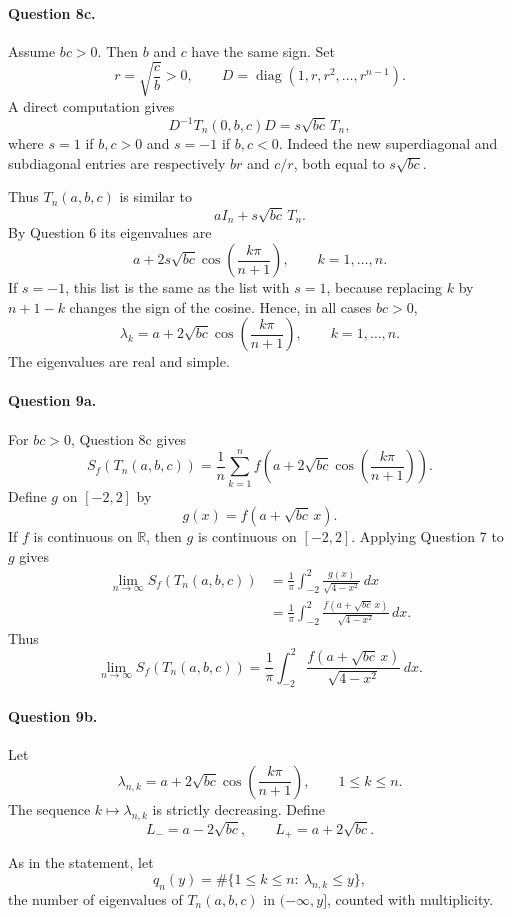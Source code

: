 \documentclass[11pt,a4paper]{article}
\newcommand{\R}{\mathbb{R}}
\DeclareMathOperator{\diag}{diag}
\begin{document}
\paragraph{Question 8c.}
Assume $bc>0$.  Then $b$ and $c$ have the same sign.  Set
\[
  r=\sqrt{\frac cb}>0,
  \qquad
  D=\diag(1,r,r^2,\dots,r^{n-1}).
\]
A direct computation gives
\[
  D^{-1}T_n(0,b,c)D=s\sqrt{bc}\,T_n,
\]
where $s=1$ if $b,c>0$ and $s=-1$ if $b,c<0$.  Indeed the new superdiagonal and subdiagonal entries are respectively $br$ and $c/r$, both equal to $s\sqrt{bc}$.

Thus $T_n(a,b,c)$ is similar to
\[
  aI_n+s\sqrt{bc}\,T_n.
\]
By Question 6 its eigenvalues are
\[
  a+2s\sqrt{bc}\cos\left(\frac{k\pi}{n+1}\right),
  \qquad k=1,
  \dots,n.
\]
If $s=-1$, this list is the same as the list with $s=1$, because replacing $k$ by $n+1-k$ changes the sign of the cosine.  Hence, in all cases $bc>0$,
\[
  \boxed{\lambda_k=a+2\sqrt{bc}\cos\left(\frac{k\pi}{n+1}\right),
  \qquad k=1,\dots,n.}
\]
The eigenvalues are real and simple.

\paragraph{Question 9a.}
For $bc>0$, Question 8c gives
\[
  S_f(T_n(a,b,c))=\frac1n\sum_{k=1}^n
  f\left(a+2\sqrt{bc}\cos\left(\frac{k\pi}{n+1}\right)\right).
\]
Define $g$ on $[-2,2]$ by
\[
  g(x)=f(a+\sqrt{bc}\,x).
\]
If $f$ is continuous on $\R$, then $g$ is continuous on $[-2,2]$.  Applying Question 7 to $g$ gives
\[
\begin{aligned}
 \lim_{n\to\infty}S_f(T_n(a,b,c))
 &=\frac1\pi\int_{-2}^2\frac{g(x)}{\sqrt{4-x^2}}\,dx\\
 &=\frac1\pi\int_{-2}^2\frac{f(a+\sqrt{bc}\,x)}{\sqrt{4-x^2}}\,dx.
\end{aligned}
\]
Thus
\[
  \boxed{\lim_{n\to\infty}S_f(T_n(a,b,c))
  =\frac1\pi\int_{-2}^2\frac{f(a+\sqrt{bc}\,x)}{\sqrt{4-x^2}}\,dx.}
\]

\paragraph{Question 9b.}
Let
\[
  \lambda_{n,k}=a+2\sqrt{bc}\cos\left(\frac{k\pi}{n+1}\right),
  \qquad 1\le k\le n.
\]
The sequence $k\mapsto\lambda_{n,k}$ is strictly decreasing.  Define
\[
  L_-=a-2\sqrt{bc},
  \qquad
  L_+=a+2\sqrt{bc}.
\]

As in the statement, let
\[
  q_n(y)=\#\{1\le k\le n:\ \lambda_{n,k}\le y\},
\]
the number of eigenvalues of $T_n(a,b,c)$ in $(-\infty,y]$, counted with
multiplicity.
\end{document}
